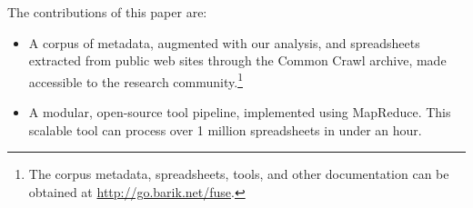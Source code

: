 \documentclass[conference]{IEEEtran}
\begin{document}





The contributions of this paper are:

 \begin{itemize}
 \item A corpus of metadata, augmented with our analysis, and spreadsheets extracted from public web sites through the Common Crawl archive, made accessible to the research community.\footnote{The corpus metadata, spreadsheets, tools, and other documentation can be obtained at \url{http://go.barik.net/fuse}.}
 \item A modular, open-source tool pipeline, implemented using MapReduce. This scalable tool can process over 1 million spreadsheets in under an hour.
 \end{itemize}
\end{document}
